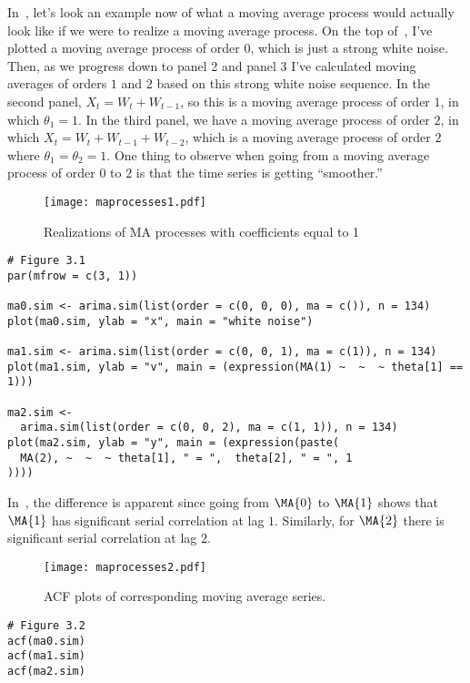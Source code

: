 {\color{blue}In~, let's look an example now of what a moving average process would
actually look like if we were to realize a moving average process.
On the top of~, I've plotted a moving average process of order $ 0 $,
which is just a strong white noise. Then, as we progress down to
panel 2 and panel 3 I've calculated moving averages of orders $ 1 $ and
$ 2 $ based on this strong white noise sequence. In the second
panel, $ X_t=W_t+W_{t-1} $, so this is a moving average process
of order $ 1 $, in which $ \theta_1=1 $. In the third panel,
we have a moving average process of order $ 2 $,
in which $ X_t=W_t+W_{t-1}+W_{t-2} $, which is a
moving average process of order $ 2 $ where
$ \theta_1=\theta_2=1 $. One thing to observe when going
from a moving average process of order $ 0 $ to $ 2 $
is that the time series is getting ``smoother.''}

\begin{figure}[!htbp]
    \centering
    \texttt{[image: maprocesses1.pdf]}
    \caption{Realizations of MA processes with coefficients equal to 1}\label{fig:maprocesses1}
\end{figure}
\begin{verbatim}
# Figure 3.1
par(mfrow = c(3, 1))

ma0.sim <- arima.sim(list(order = c(0, 0, 0), ma = c()), n = 134)
plot(ma0.sim, ylab = "x", main = "white noise")

ma1.sim <- arima.sim(list(order = c(0, 0, 1), ma = c(1)), n = 134)
plot(ma1.sim, ylab = "v", main = (expression(MA(1) ~  ~  ~ theta[1] == 1)))

ma2.sim <-
  arima.sim(list(order = c(0, 0, 2), ma = c(1, 1)), n = 134)
plot(ma2.sim, ylab = "y", main = (expression(paste(
  MA(2), ~  ~  ~ theta[1], " = ",  theta[2], " = ", 1
))))
\end{verbatim}
In~, the difference is apparent since
going from $ \MA{0} $ to $ \MA{1} $ shows that
$ \MA{1} $ has significant serial correlation
at lag $ 1 $. Similarly, for $ \MA{2} $
there is significant serial correlation
at lag $ 2 $.
\begin{figure}[!htbp]
    \centering
    \texttt{[image: maprocesses2.pdf]}
    \caption{ACF plots of corresponding moving average series.}\label{fig:maprocesses2}
\end{figure}
\begin{verbatim}
# Figure 3.2
acf(ma0.sim)
acf(ma1.sim)
acf(ma2.sim)    
\end{verbatim}
